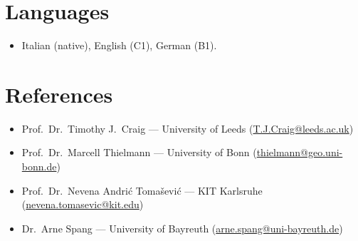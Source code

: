 \documentclass[11pt,a4paper,sans]{moderncv}
\begin{document}

\section{Languages}
\vspace{1pt}
\begin{itemize}
\item Italian (native), English (C1), German (B1).
\end{itemize}


\section{References}
\vspace{1pt}
\begin{itemize}
\item Prof.\ Dr.\ Timothy J.\ Craig --- University of Leeds (\href{mailto:T.J.Craig@leeds.ac.uk}{T.J.Craig@leeds.ac.uk})
\item Prof.\ Dr.\ Marcell Thielmann --- University of Bonn (\href{mailto:thielmann@geo.uni-bonn.de}{thielmann@geo.uni-bonn.de})
\item Prof.\ Dr.\ Nevena Andri\'c Toma\v{s}evi\'c --- KIT Karlsruhe (\href{mailto:nevena.tomasevic@kit.edu}{nevena.tomasevic@kit.edu})
\item Dr.\ Arne Spang --- University of Bayreuth (\href{mailto:arne.spang@uni-bayreuth.de}{arne.spang@uni-bayreuth.de})
\end{itemize}
\end{document}
